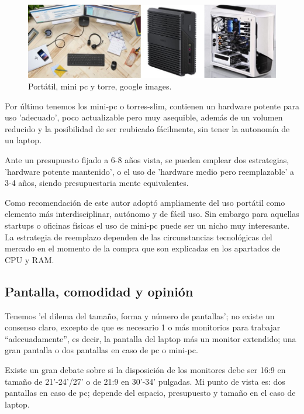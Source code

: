 \begin{figure}[htb]
\begin{center}
\includegraphics[width=1\textwidth]{./figuras/laptop_minipc_torre.jpg}
\caption{Portátil, mini pc y torre, google images. }
\label{F:laptop_minipc_torre}
\end{center}
\end{figure}

Por último tenemos los mini-pc o torres-slim, contienen un hardware potente para uso 'adecuado', poco actualizable pero muy asequible, además de un volumen reducido y la posibilidad de ser reubicado fácilmente, sin tener la autonomía de un laptop.

Ante un presupuesto fijado a 6-8 años vista, se pueden emplear dos estrategias, 'hardware potente mantenido', o el uso de 'hardware medio pero reemplazable' a 3-4 años, siendo presupuestaria mente equivalentes.

Como recomendación de este autor adoptó ampliamente del uso portátil como elemento más interdisciplinar, autónomo y de fácil uso. Sin embargo para aquellas startups o oficinas físicas el uso de mini-pc puede ser un nicho muy interesante. La estrategia de reemplazo dependen de las circunstancias tecnológicas del mercado en el momento de la compra que son explicadas en los apartados de CPU y RAM.

\subsection{Pantalla, comodidad y opinión}\label{S:pantallas}
Tenemos 'el dilema del tamaño, forma y número de pantallas'; no existe un consenso claro, excepto de que es necesario 1 o más monitorios para trabajar “adecuadamente”, es decir, la pantalla del laptop más un monitor extendido; una gran pantalla o dos pantallas en caso de pc o mini-pc. 

Existe un gran debate sobre si la disposición de los monitores debe ser 16:9 en tamaño de 21’-24’/27’ o de 21:9 en 30’-34’ pulgadas. Mi punto de vista es:  dos pantallas en caso de pc; depende del espacio, presupuesto y tamaño en el caso de laptop.

